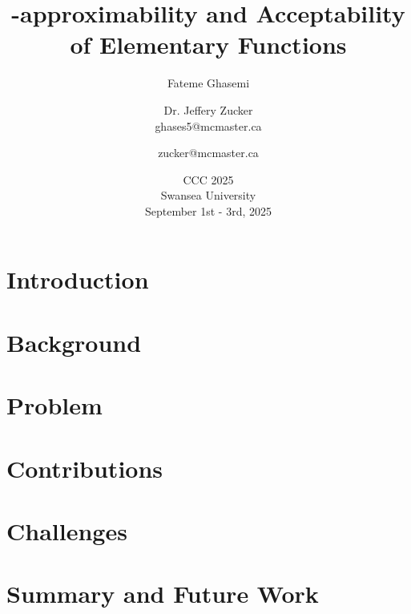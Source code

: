 \documentclass[
handout, 
aspectratio=169,
notes,
t]
{beamer}
\title{\WhileCC-approximability and Acceptability of Elementary Functions}
\author{Fateme Ghasemi \and Dr. Jeffery Zucker\\
ghases5@mcmaster.ca \and zucker@mcmaster.ca\\
}
\date{CCC 2025\\
Swansea University\\
September 1st - 3rd, 2025}
\begin{document}
\small
\maketitle

\section{Introduction}
    
\section{Background}
    
\section{Problem}
    
\section{Contributions}
    
    
    
\section{Challenges}
    
    
    
\section{Summary and Future Work}
    
    
    
    
    
\end{document}
